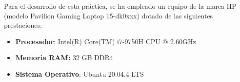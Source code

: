Para el desarrollo de esta práctica, se ha empleado un equipo de la marca HP (modelo Pavilion Gaming Laptop 15-dk0xxx) 
dotado de las siguientes prestaciones: 

\begin{itemize}
    \item \textbf{Procesador}: Intel(R) Core(TM) i7-9750H CPU @ 2.60GHz
    \item \textbf{Memoria RAM:} 32 GB DDR4
    \item \textbf{Sistema Operativo}: Ubuntu 20.04.4 LTS
\end{itemize}
